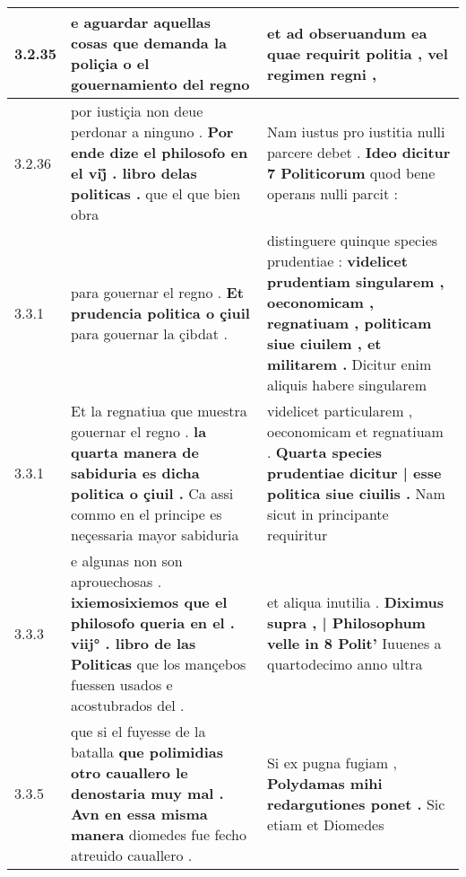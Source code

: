 \begin{tabular}{|p{1cm}|p{6.5cm}|p{6.5cm}|}
3.2.35 & e aguardar aquellas cosas \textbf{ que demanda la poliçia } o el gouernamiento del regno & et ad obseruandum \textbf{ ea quae requirit politia , } vel regimen regni , \\\hline
3.2.36 & por iustiçia non deue perdonar a ninguno . \textbf{ Por ende dize el philosofo en el vij̊ . libro delas politicas . } que el que bien obra & Nam iustus pro iustitia nulli parcere debet . \textbf{ Ideo dicitur 7 Politicorum } quod bene operans nulli parcit : \\\hline
3.3.1 & para gouernar el regno . \textbf{ Et prudencia politica o çiuil } para gouernar la çibdat . & distinguere quinque species prudentiae : \textbf{ videlicet prudentiam singularem , oeconomicam , regnatiuam , politicam siue ciuilem , et militarem . } Dicitur enim aliquis habere singularem \\\hline
3.3.1 & Et la regnatiua que muestra gouernar el regno . \textbf{ la quarta manera de sabiduria es dicha politica o çiuil . } Ca assi commo en el principe es neçessaria mayor sabiduria & videlicet particularem , oeconomicam et regnatiuam . \textbf{ Quarta species prudentiae dicitur | esse politica siue ciuilis . } Nam sicut in principante requiritur \\\hline
3.3.3 & e algunas non son aprouechosas . \textbf{ ixiemosixiemos que el philosofo queria en el . viij° . libro de las Politicas } que los mançebos fuessen usados e acostubrados del . & et aliqua inutilia . \textbf{ Diximus supra , | Philosophum velle in 8 Polit’ } Iuuenes a quartodecimo anno ultra \\\hline
3.3.5 & que si el fuyesse de la batalla \textbf{ que polimidias otro cauallero le denostaria muy mal . Avn en essa misma manera } diomedes fue fecho atreuido cauallero . & Si ex pugna fugiam , \textbf{ Polydamas mihi redargutiones ponet . } Sic etiam et Diomedes \\\hline

\end{tabular}
